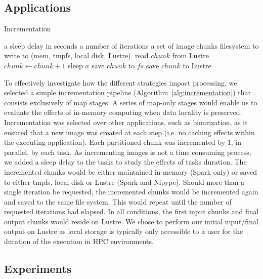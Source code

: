 \documentclass{IEEEtran}
\newcommand{\Desc}[2]{\State \makebox[2em][l]{#1}#2}
\begin{document}
\subsection{Applications} %
\begin{algorithm}\caption{Incrementation}\label{alg:incrementation}
    \begin{algorithmic}[1]
    \Input
    \Desc{$x$}{a sleep delay in seconds}
    \Desc{$n$}{a number of iterations}
    \Desc{$C$}{a set of image chunks}
    \Desc{$fs$}{filesystem to write to (mem, tmpfs, local disk, Lustre).}
    \EndInput
    \State read $chunk$ from Lustre
        \State $chunk\gets chunk+1$
        \State sleep $x$
        \State save $chunk$ to $fs$
        \EndIf
    \EndFor
    \State save $chunk$ to Lustre
    \EndFor
\end{algorithmic}
\end{algorithm}

To effectively investigate how the different strategies impact processing, we 
selected a simple incrementation pipeline (Algorithm~\ref{alg:incrementation}) 
that consists exclusively of map 
stages. A series of map-only stages would enable us to evaluate the effects of
in-memory computing when data locality is preserved. Incrementation was 
selected 
over other applications, such as binarization, as it ensured that a new image
was created at each step (i.e. no caching effects within the executing 
application). Each partitioned chunk was incremented by 1, in parallel, by
each task. As incrementing images is not a time consuming process,
we added a sleep delay to the tasks to study the effects 
of tasks duration. The incremented chunks would be either 
maintained in-memory (Spark only) or saved to either tmpfs, local disk or 
Lustre (Spark and Nipype). Should more than a single iteration be requested, 
the incremented chunks would be incremented again and saved to the same file system. 
This would repeat until the number of requested iterations had elapsed. In all 
conditions, the first input chunks and final output chunks would reside on Lustre. 
We chose to perform our initial input/final output on Lustre as local storage is
typically only accessible to a user for the duration of the execution in HPC
environments.

\subsection{Experiments}
\end{document}
